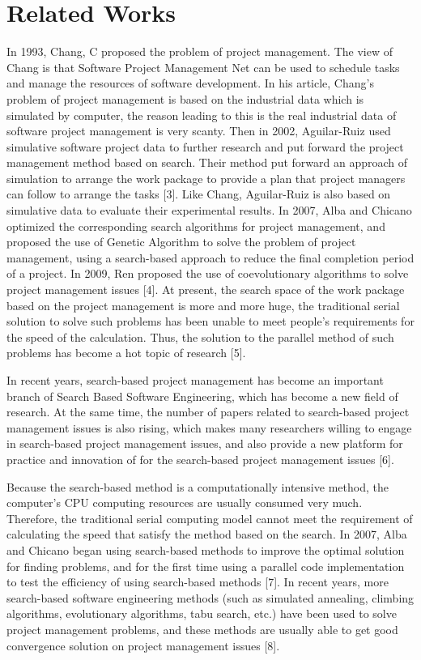 
\section{Related Works}
%
In 1993, Chang, C proposed the problem of project management.
The view of Chang is that Software Project Management Net can
be used to schedule tasks and manage the resources of software
development. In his article, Chang's problem of project management is based 
on the industrial data which is simulated by computer, the reason leading to 
this is the real industrial data of software project management is very 
scanty. Then in 2002, Aguilar-Ruiz used simulative software project data to 
further research and put forward the project management method based on 
search. Their method put forward an approach of simulation to arrange the 
work package to provide a plan that project managers can follow to arrange 
the tasks [3]. Like Chang, Aguilar-Ruiz is also based on simulative data to 
evaluate their experimental results. In 2007, Alba and Chicano optimized the 
corresponding search algorithms for project management, and proposed the use 
of Genetic Algorithm to solve the problem of project management, using a 
search-based approach to reduce the final completion period of a project. In 
2009, Ren proposed the use of coevolutionary algorithms to solve project 
management issues [4]. At present, the search space of the work package based 
on the project management is more and more huge, the traditional serial 
solution to solve such problems has been unable to meet people's requirements 
for the speed of the calculation. Thus, the solution to the parallel method 
of such problems has become a hot topic of research [5].


In recent years, search-based project management has become an important 
branch of Search Based Software Engineering, which has become a new field of 
research. At the same time, the number of papers related to search-based 
project management issues is also rising, which makes many researchers 
willing to engage in search-based project management issues, and also provide 
a new platform for practice and innovation of for the search-based project 
management issues [6].


Because the search-based method is a computationally intensive method, the 
computer's CPU computing resources are usually consumed very much. Therefore, 
the traditional serial computing model cannot meet the requirement of 
calculating the speed that satisfy the method based on the search. In 2007, 
Alba and Chicano began using search-based methods to improve the optimal 
solution for finding problems, and for the first time using a parallel code 
implementation to test the efficiency of using search-based methods [7]. In 
recent years, more search-based software engineering methods (such as 
simulated annealing, climbing algorithms, evolutionary algorithms, tabu 
search, etc.) have been used to solve project management problems, and these 
methods are usually able to get good convergence solution on project 
management issues [8].


